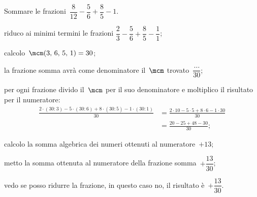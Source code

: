 \begin{exrig}
 \begin{esempio}
Sommare le frazioni~$\dfrac{8}{12}-\dfrac{5}{6}+\dfrac{8}{5}-1$.
 \begin{enumeratea}
  \item riduco ai minimi termini le frazioni
  ${\dfrac{2}{3}-\dfrac{5}{6}+\dfrac{8}{5}-\dfrac{1}{1}}$;
  \item calcolo~$\mcm(3\text{,~}6\text{,~}5\text{,~}1)=30$;
  \item la frazione somma avrà come denominatore il~$\mcm$ trovato~$\dfrac{\ldots}{30}$;
  \item per ogni frazione divido il~$\mcm$ per il suo denominatore e moltiplico il risultato
  per il numeratore:
  \begin{align*}
  \frac{2\cdot(30:3)-5\cdot(30:6)+8\cdot(30:5)-1\cdot(30:1)}{30}&=
  \frac{2\cdot10-5\cdot5+8\cdot6-1\cdot30}{30}\\
  &=\frac{20-25+48-30}{30};
  \end{align*}
  \item calcolo la somma algebrica dei numeri ottenuti al numeratore~$+13$;
  \item metto la somma ottenuta al numeratore della frazione somma~$+\dfrac{13}{30}$;
  \item vedo se posso ridurre la frazione, in questo caso no, il risultato è~$+\dfrac{13}{30}$.
 \end{enumeratea}
 \end{esempio}
\begin{comment}
\begin{esempio}
Sommare le frazioni~$\dfrac{8}{12}-\dfrac{5}{6}+\dfrac{8}{5}-1$.

\paragraph*{Passo~$a$} riduco ai minimi termini le frazioni
$\displaystyle{\frac{2}{3}-\frac{5}{6}+\frac{8}{5}-\frac{1}{1}}$
\paragraph*{Passo~$b$} calcolo~$\mcm(3\text{,~}6\text{,~}5\text{,~}1)=30$
\paragraph*{Passo~$c$} la frazione somma avrà come denominatore il~$\mcm$ trovato~$\dfrac{\ldots}{30}$

\end{comment}
\end{exrig}
